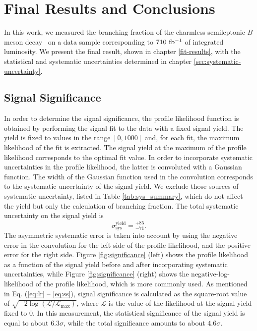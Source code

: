 \chapter{Final Results and Conclusions}\label{sec:results}

In this work, we measured the branching fraction of the charmless semileptonic $B$ meson decay \decayb~on a data sample corresponding to $710\mathrm{~fb^{-1}}$ of integrated luminosity. We present the final result, shown in chapter \ref{fit-results}, with the statistical and systematic uncertainties determined in chapter \ref{sec:systematic-uncertainty}.

\section{Signal Significance}

In order to determine the signal significance, the profile likelihood function is obtained by performing the signal fit to the data with a fixed signal yield. The yield is fixed to values in the range $[0, 1000]$ and, for each fit, the maximum likelihood of the fit is extracted. The signal yield at the maximum of the profile likelihood corresponds to the optimal fit value. In order to incorporate systematic uncertainties in the profile likelihood, the latter is convoluted with a Gaussian function. The width of the Gaussian function used in the convolution corresponds to the systematic uncertainty of the signal yield. We exclude those sources of systematic uncertainty, listed in Table \ref{tab:sys_summary}, which do not affect the yield but only the calculation of branching fraction. The total systematic uncertainty on the signal yield is
\begin{equation}
\sigma_{\mathrm{sys}}^{\mathrm{yield}} = {}_{-71}^{+85}.
\end{equation}
The asymmetric systematic error is taken into account by using the negative error in the convolution for the left side of the profile likelihood, and the positive error for the right side. Figure \ref{fig:significance} (left) shows the profile likelihood as a function of the signal yield before and after incorporating systematic uncertainties, while Figure \ref{fig:significance} (right) shows the negative-log-likelihood of the profile likelihood, which is more commonly used. As mentioned in Eq. (\ref{eq:lr} -- \ref{eq:ss}), signal significance is calculated as the square-root value of $\sqrt{-2\log(\mathcal{L}/\mathcal{L}_{\mathrm{max}})}$, where $\mathcal{L}$ is the value of the likelihood at the signal yield fixed to 0. In this measurement, the statistical significance of the signal yield is equal to about $6.3\sigma$, while the total significance amounts to about $4.6\sigma$.

